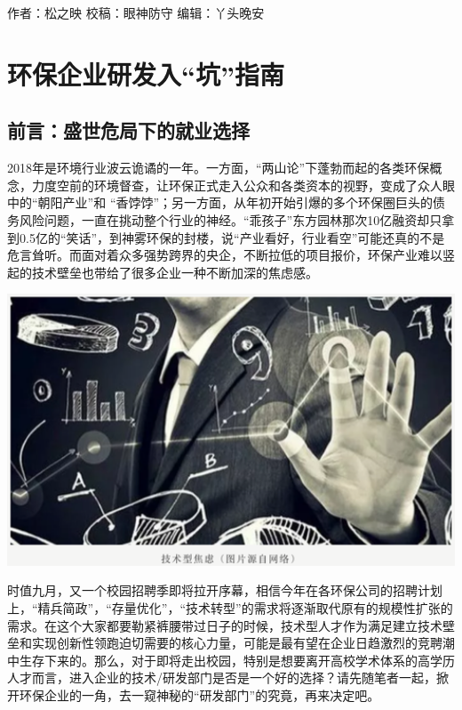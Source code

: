 \documentclass[
]{book}
\begin{document}
作者：松之映
校稿：眼神防守
编辑：丫头晚安

\hypertarget{ux73afux4fddux4f01ux4e1aux7814ux53d1ux5165ux5751ux6307ux5357}{%
\section{环保企业研发入``坑''指南}\label{ux73afux4fddux4f01ux4e1aux7814ux53d1ux5165ux5751ux6307ux5357}}

\hypertarget{ux524dux8a00ux76dbux4e16ux5371ux5c40ux4e0bux7684ux5c31ux4e1aux9009ux62e9}{%
\subsection{前言：盛世危局下的就业选择}\label{ux524dux8a00ux76dbux4e16ux5371ux5c40ux4e0bux7684ux5c31ux4e1aux9009ux62e9}}

2018年是环境行业波云诡谲的一年。一方面，``两山论''下蓬勃而起的各类环保概念，力度空前的环境督查，让环保正式走入公众和各类资本的视野，变成了众人眼中的``朝阳产业''和 ``香饽饽''；另一方面，从年初开始引爆的多个环保圈巨头的债务风险问题，一直在挑动整个行业的神经。``乖孩子''东方园林那次10亿融资却只拿到0.5亿的``笑话''，到神雾环保的封楼，说``产业看好，行业看空''可能还真的不是危言耸听。而面对着众多强势跨界的央企，不断拉低的项目报价，环保产业难以竖起的技术壁垒也带给了很多企业一种不断加深的焦虑感。

\includegraphics[width=6.67in]{images/qiye1}

时值九月，又一个校园招聘季即将拉开序幕，相信今年在各环保公司的招聘计划上，``精兵简政''，``存量优化''，``技术转型''的需求将逐渐取代原有的规模性扩张的需求。在这个大家都要勒紧裤腰带过日子的时候，技术型人才作为满足建立技术壁垒和实现创新性领跑迫切需要的核心力量，可能是最有望在企业日趋激烈的竞聘潮中生存下来的。那么，对于即将走出校园，特别是想要离开高校学术体系的高学历人才而言，进入企业的技术/研发部门是否是一个好的选择？请先随笔者一起，掀开环保企业的一角，去一窥神秘的``研发部门''的究竟，再来决定吧。
\end{document}
